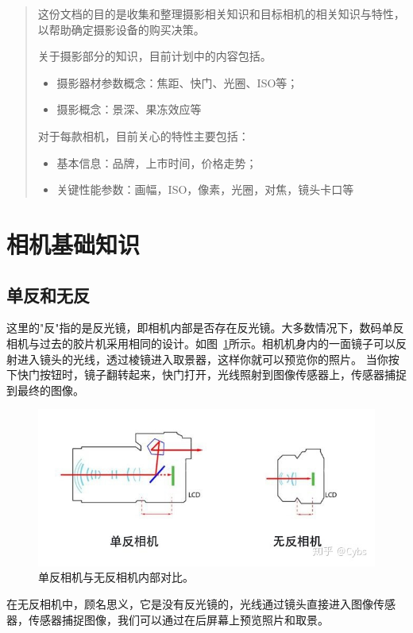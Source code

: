 \documentclass{ctexart}
\begin{document}
\tableofcontents

\begin{abstract}
这份文档的目的是收集和整理摄影相关知识和目标相机的相关知识与特性，以帮助确定摄影设备的购买决策。

关于摄影部分的知识，目前计划中的内容包括。
\begin{itemize}
    \item 摄影器材参数概念：焦距、快门、光圈、ISO等；
    \item 摄影概念：景深、果冻效应等
\end{itemize}
对于每款相机，目前关心的特性主要包括：
\begin{itemize}
    \item 基本信息：品牌，上市时间，价格走势；
    \item 关键性能参数：画幅，ISO，像素，光圈，对焦，镜头卡口等
\end{itemize}
\end{abstract}

\section{相机基础知识}

\subsection{单反和无反}
这里的"反"指的是反光镜，即相机内部是否存在反光镜。大多数情况下，数码单反相机与过去的胶片机采用相同的设计。如图~\ref{fig_single_lens_reflex_vs_mirrorless}所示。相机机身内的一面镜子可以反射进入镜头的光线，透过棱镜进入取景器，这样你就可以预览你的照片。 当你按下快门按钮时，镜子翻转起来，快门打开，光线照射到图像传感器上，传感器捕捉到最终的图像。
\begin{figure}
    \centering
    \includegraphics[width=.8\textwidth]{imgs/camera_single_lens_reflex_mirrorless.jpg}
    \caption{单反相机与无反相机内部对比。}
    \label{fig_single_lens_reflex_vs_mirrorless}
\end{figure}
在无反相机中，顾名思义，它是没有反光镜的，光线通过镜头直接进入图像传感器，传感器捕捉图像，我们可以通过在后屏幕上预览照片和取景。
\end{document}

